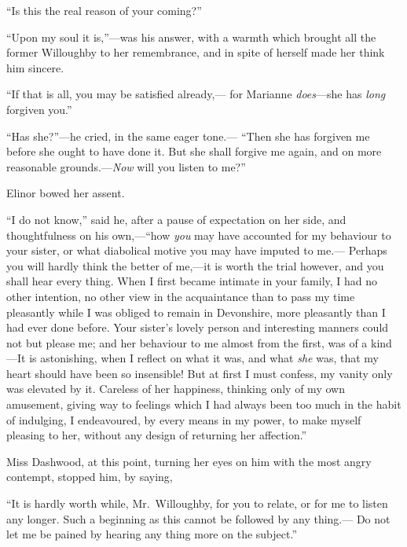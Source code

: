 ``Is this the real reason of your coming?''

``Upon my soul it is,''---was his answer, with a warmth
which brought all the former Willoughby to her remembrance,
and in spite of herself made her think him sincere.

``If that is all, you may be satisfied already,---%
for Marianne \emph{does}---she has \emph{long} forgiven you.''

``Has she?''---he cried, in the same eager tone.---%
``Then she has forgiven me before she ought to have done it.
But she shall forgive me again, and on more reasonable
grounds.---\emph{Now} will you listen to me?''

Elinor bowed her assent.

``I do not know,'' said he, after a pause of expectation
on her side, and thoughtfulness on his own,---``how \emph{you}
may have accounted for my behaviour to your sister,
or what diabolical motive you may have imputed to me.---%
Perhaps you will hardly think the better of me,---it is
worth the trial however, and you shall hear every thing.
When I first became intimate in your family, I had no
other intention, no other view in the acquaintance
than to pass my time pleasantly while I was obliged to remain
in Devonshire, more pleasantly than I had ever done before.
Your sister's lovely person and interesting manners
could not but please me; and her behaviour to me almost
from the first, was of a kind---It is astonishing,
when I reflect on what it was, and what \emph{she} was, that my
heart should have been so insensible!  But at first
I must confess, my vanity only was elevated by it.
Careless of her happiness, thinking only of my own amusement,
giving way to feelings which I had always been too much
in the habit of indulging, I endeavoured, by every means
in my power, to make myself pleasing to her, without any
design of returning her affection.''

Miss Dashwood, at this point, turning her eyes on him
with the most angry contempt, stopped him, by saying,

``It is hardly worth while, Mr.\ Willoughby,
for you to relate, or for me to listen any longer.
Such a beginning as this cannot be followed by any thing.---%
Do not let me be pained by hearing any thing more on
the subject.''

